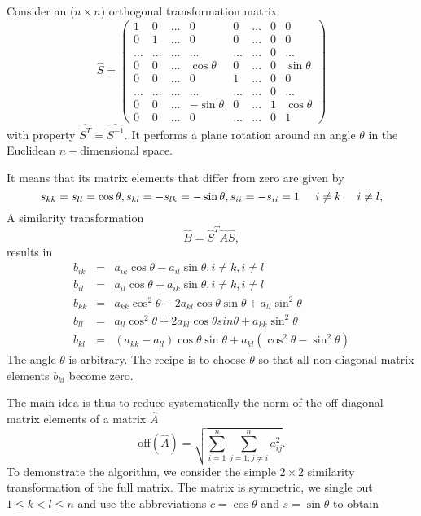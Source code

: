 Consider an  ($n\times n$) orthogonal transformation matrix 
%
\[
\hat{S}=
 \left( 
   \begin{array}{cccccccc}
   1  &    0  & \dots &   0        &    0  & \dots & 0 &   0       \\
   0  &    1  & \dots &   0        &    0  & \dots & 0 &   0       \\
\dots & \dots & \dots & \dots      & \dots & \dots & 0 & \dots     \\ 
   0  &    0  & \dots & \cos\theta  &    0  & \dots & 0 & \sin\theta \\
   0  &    0  & \dots &   0        &    1  & \dots & 0 &   0       \\
\dots & \dots & \dots & \dots      & \dots & \dots & 0 & \dots     \\
   0  &    0  & \dots &  -\sin\theta        &    0  & \dots & 1 &   \cos\theta       \\ 
   0  &    0  & \dots & 0 & \dots & \dots & 0 & 1  
   \end{array}
 \right)
\]
%
with property $\hat{S^{T}} = \hat{S^{-1}}$.
It performs a plane rotation around an angle $\theta$ in the Euclidean 
$n-$dimensional space. 


It means that its matrix elements that differ
from zero are given by
%
\[
    s_{kk}= s_{ll}=\cos\theta, 
    s_{kl}=-s_{lk}= -\sin\theta, 
    s_{ii}=-s_{ii}=1\hspace{0.5cm} i\ne k \hspace{0.5cm} i \ne l,
\]
%
A similarity transformation 
%
\[
     \hat{B}= \hat{S}^T \hat{A}\hat{S},
\]
%
results in 
%
\begin{eqnarray*}
b_{ik} &=& a_{ik}\cos\theta - a_{il}\sin\theta , i \ne k, i \ne l \\
b_{il} &=& a_{il}\cos\theta + a_{ik}\sin\theta , i \ne k, i \ne l \nonumber\\
b_{kk} &=& a_{kk}\cos^2\theta - 2a_{kl}\cos\theta \sin\theta +a_{ll}\sin^2\theta\nonumber\\
b_{ll} &=& a_{ll}\cos^2\theta +2a_{kl}\cos\theta sin\theta +a_{kk}\sin^2\theta\nonumber\\
b_{kl} &=& (a_{kk}-a_{ll})\cos\theta \sin\theta +a_{kl}(\cos^2\theta-\sin^2\theta)\nonumber 
\end{eqnarray*}
%
The angle $\theta$ is  arbitrary. The recipe is to choose  $\theta$ so that all
non-diagonal matrix elements $b_{kl}$ become zero.  


The main idea is thus to reduce systematically the 
norm of the 
off-diagonal matrix elements  of a matrix  $\hat{A}$ 
\[
\mathrm{off}(\hat{A}) = \sqrt{\sum_{i=1}^n\sum_{j=1,j\ne i}^n a_{ij}^2}.
\]
 To demonstrate the algorithm, we consider the  simple $2\times 2$  similarity transformation
of the full matrix. The matrix is symmetric, we single out $ 1\le k < l \le n$  and 
use the abbreviations $c=\cos\theta$ and $s=\sin\theta$ to obtain

